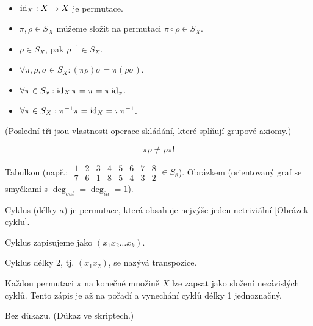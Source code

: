 \documentclass[12pt]{article}					%
\begin{document}
    \begin{poznamka}
        \ 
        \begin{itemize}
            \item $\operatorname{id}_X: X \rightarrow X$ je permutace.
            \item $\pi, \rho \in S_X$ můžeme složit na permutaci $\pi \circ \rho \in S_X$.
            \item $\rho \in S_X$, pak $\rho^{-1} \in S_X$.
            \item $\forall \pi, \rho, \sigma \in S_X: (\pi\rho)\sigma = \pi(\rho\sigma)$.
            \item $\forall \pi \in S_x: \operatorname{id}_X \pi = \pi = \pi \operatorname{id}_x$.
            \item $\forall \pi \in S_X: \pi^{-1}\pi = \operatorname{id}_X = \pi\pi^{-1}$.
        \end{itemize}

        (Poslední tři jsou vlastnosti operace skládání, které splňují grupové axiomy.)
    \end{poznamka}

    \begin{upozorneni}
        $$ \pi\rho ≠ \rho\pi! $$ 
    \end{upozorneni}

    \begin{poznamka}
        Tabulkou (např.: $\begin{array}{cccccccc} 1 & 2 & 3 & 4 & 5 & 6 & 7 & 8 \\ 7 & 6 & 1 & 8 & 5 & 4 & 3 & 2 \end{array} \in S_8$). Obrázkem (orientovaný graf se smyčkami s $\deg_{out} = \deg_{in} = 1$).
    \end{poznamka}

    \begin{definice}
        Cyklus (délky $a$) je permutace, která obsahuje nejvýše jeden netriviální [Obrázek cyklu].

        Cyklus zapisujeme jako $(x_1 x_2 … x_k)$.

        Cyklus délky 2, tj. $(x_1 x_2)$, se nazývá transpozice.
    \end{definice}

    \begin{tvrzeni}
        Každou permutaci $\pi$ na konečné množině $X$ lze zapsat jako složení nezávislých cyklů. Tento zápis je až na pořadí a vynechání cyklů délky 1 jednoznačný.

        \begin{dukazin}
            Bez důkazu. (Důkaz ve skriptech.)
        \end{dukazin}
    \end{tvrzeni}
\end{document}
